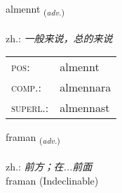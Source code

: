 \documentclass[frontgrid, backgrid]{flacards}\usepackage[]{graphicx}\usepackage[]{xcolor}
\begin{document}
\renewcommand{\blhead}{\vskip5pt {\small\bfseries\footnotesize Atviksorð | 副词 }}
\renewcommand{\bcfoot}{\vskip5pt \hspace{2pt}{\small\bfseries\footnotesize 1K}}


{almennt \small{\textsubscript{(\textit{adv.})}} \\[1ex] %
\textphonetic{[almɛn̥t]} \\
zh.: \emph{一般来说，总的来说} \\  [2ex]
\renewcommand*{\arraystretch}{0.8}
\begin{tabular}{ll}
\textsc{pos}: & almennt \\ 
\textsc{comp.}: & almennara \\ 
\textsc{superl.}: & almennast \\
\end{tabular}
}


\renewcommand{\flhead}{\vskip5pt \fboxsep=0pt {\small\bfseries\footnotesize Atviksorð | 副词}}
\renewcommand{\fcfoot}{\vskip5pt \fboxsep=0pt \hspace{2pt}{\small\bfseries\footnotesize 1K}}

\renewcommand{\blhead}{\vskip5pt {\small\bfseries\footnotesize Atviksorð | 副词 }}
\renewcommand{\bcfoot}{\vskip5pt \hspace{2pt}{\small\bfseries\footnotesize 1K}}


{framan \small{\textsubscript{(\textit{adv.})}} \\[1ex]
\textphonetic{[fraːman]} \\
zh.: \emph{前方；在...前面} \\  [2ex]
framan (Indeclinable)}

\renewcommand{\flhead}{\vskip5pt \fboxsep=0pt {\small\bfseries\footnotesize Nafnorð | 名词}}
\renewcommand{\fcfoot}{\vskip5pt \fboxsep=0pt \hspace{2pt}{\small\bfseries\footnotesize 1K}}

\renewcommand{\blhead}{\vskip5pt {\small\bfseries\footnotesize Nafnorð | 名词 }}
\renewcommand{\bcfoot}{\vskip5pt \hspace{2pt}{\small\bfseries\footnotesize 1K}}
\end{document}
